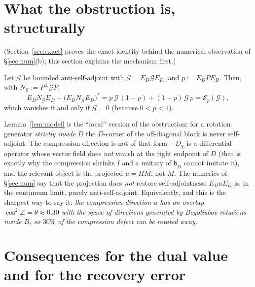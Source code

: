 \documentclass[11pt]{article}
\begin{document}
\section{What the obstruction is, structurally}\label{sec:struct}

(Section~\ref{sec:exact} proves the exact identity behind the numerical observation of
\S\ref{sec:num}(b); this section explains the mechanism first.)

\begin{lemma}\label{lem:model}
Let $\mathcal G$ be bounded anti-self-adjoint with $\mathcal G=E_D\mathcal GE_D$, and
$p:=E_DPE_D$.  Then, with $N_{\mathcal G}:=P^\perp\mathcal GP$,
\begin{equation}\label{eq:model}
 E_DN_{\mathcal G}E_D-\bigl(E_DN_{\mathcal G}E_D\bigr)^*
 = p\,\mathcal G\,(1-p)+(1-p)\,\mathcal G\,p=\mathcal S_p(\mathcal G),
\end{equation}
which vanishes if and only if $\mathcal G=0$ (because $0<p<1$).
\end{lemma}

\begin{remark}\label{rem:reading}
Lemma~\ref{lem:model} is the ``local'' version of the obstruction: for a rotation
generator \emph{strictly inside} $D$ the $D$-corner of the off-diagonal block is never
self-adjoint.  The compression direction is not of that form -- $D_\chi$ is a
differential operator whose vector field does \emph{not} vanish at the right endpoint of
$D$ (that is exactly why the compression shrinks $I$ and a unitary of $\mathfrak h_D$
cannot imitate it), and the relevant object is the projected $u=\Pi M$, not $M$.  The
numerics of \S\ref{sec:num} say that the projection does \emph{not} restore
self-adjointness: $E_DuE_D$ is, in the continuum limit, purely anti-self-adjoint.
Equivalently, and this is the sharpest way to say it: \emph{the compression direction
$u$ has an overlap $\cos^2\angle=\theta\approx0.30$ with the space of directions
generated by Bogoliubov rotations inside $B$, so $30\%$ of the compression defect can be
rotated away.}
\end{remark}

\section{Consequences for the dual value and for the recovery error}\label{sec:conseq}
\end{document}
